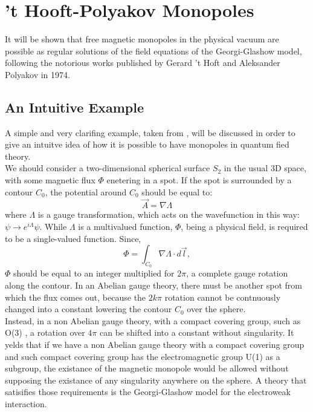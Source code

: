 \section{’t Hooft-Polyakov Monopoles}
It will be shown that free magnetic monopoles in the physical vacuum are possible as regular solutions of the field equations of the Georgi-Glashow model, following the notorious works published by Gerard 't Hoft \cite{Hof:Mon} and Aleksander Polyakov \cite{Pol:Mon} in 1974. 
\subsection{An Intuitive Example}
A simple and very clarifing example, taken from \cite{Hof:Mon}, will be discussed in order to give an intuitve idea of how it is possible to have monopoles in quantum fied theory.  \\
We should consider a two-dimensional spherical surface $S_2$ in the usual 3D space, with some magnetic flux $\Phi$ enetering in a spot. If the spot is surrounded by a contour $C_0$, the potential around $C_0$ should be equal to: 
\begin{equation}
    \Vec{A}= \nabla \Lambda 
\end{equation}
where $\Lambda$ is a gauge transformation, which acts on the wavefunction in this way: $\psi \rightarrow e^{i\Lambda} \psi $. 
While $\Lambda$ is a multivalued function, $\Phi$, being a physical field, is required to be a single-valued function. Since, 
\begin{equation}
    \Phi = \int_{C_0} \nabla \Lambda \cdot d\Vec{l},
\end{equation} 
$\Phi$ should be equal to an integer multiplied for $2 \pi  $, a complete gauge rotation along the contour. 
In an Abelian gauge theory, there must be another spot from which the flux comes out, because the $2k \pi$ rotation cannot be contnuously changed into a constant lowering the contour $C_0$ over the sphere. \\ 
Instead, in a non Abelian gauge theory, with a compact covering group, such as O(3) , a rotation over $4\pi$ can be shifted into a constant without singularity.
It yelds that if we have a non Abelian gauge theory with a compact covering group and such compact covering group has the electromagnetic group U(1) as a subgroup, the existance of the magnetic monopole would be allowed without supposing the existance of any singularity anywhere on the sphere.
A theory that satisifies those requirements is the Georgi-Glashow model for the electroweak interaction.

